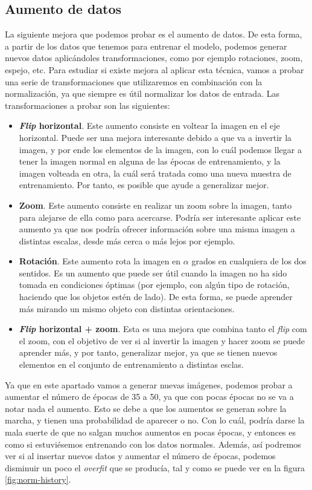 \documentclass[11pt,a4paper]{article}
\begin{document}
\subsection{Aumento de datos}

La siguiente mejora que podemos probar es el aumento de datos. De esta forma, a partir de los datos que tenemos para entrenar
el modelo, podemos generar nuevos datos aplicándoles transformaciones, como por ejemplo rotaciones, zoom, espejo, etc. Para
estudiar si existe mejora al aplicar esta técnica, vamos a probar una serie de transformaciones que utilizaremos en combinación
con la normalización, ya que siempre es útil normalizar los datos de entrada. Las transformaciones a probar son las siguientes:

\begin{itemize}
  \item \textbf{\textit{Flip} horizontal}. Este aumento consiste en voltear la imagen en el eje horizontal. Puede ser
  una mejora interesante debido a que va a invertir la imagen, y por ende los elementos de la imagen, con lo cuál podemos llegar
  a tener la imagen normal en alguna de las épocas de entrenamiento, y la imagen volteada en otra, la cuál será tratada como una
  nueva   muestra de entrenamiento. Por tanto, es posible que ayude a generalizar mejor.
  \item \textbf{Zoom}. Este aumento consiste en realizar un zoom sobre la imagen, tanto para alejarse de ella como para
  acercarse. Podría ser interesante aplicar este aumento ya que nos podría ofrecer información sobre una misma imagen a distintas
  escalas, desde más cerca o más lejos por ejemplo.
  \item \textbf{Rotación}. Este aumento rota la imagen en $\alpha$ grados en cualquiera de los dos sentidos. Es un aumento que puede
  ser útil cuando la imagen no ha sido tomada en condiciones óptimas (por ejemplo, con algún tipo de rotación, haciendo que los
  objetos estén de lado). De esta forma, se puede aprender más mirando un mismo objeto con distintas orientaciones.
  \item \textbf{\textit{Flip} horizontal + zoom}. Esta es una mejora que combina tanto el \textit{flip} com el zoom, con
  el objetivo de ver si al invertir la imagen y hacer zoom se puede aprender más, y por tanto, generalizar mejor, ya que se
  tienen nuevos elementos en el conjunto de entrenamiento a distintas esclas.
\end{itemize}

Ya que en este apartado vamos a generar nuevas imágenes, podemos probar a aumentar el número de épocas de 35 a 50, ya que con
pocas épocas no se va a notar nada el aumento. Esto se debe a que los aumentos se generan sobre la marcha, y tienen una probabilidad
de aparecer o no. Con lo cuál, podría darse la mala suerte de que no salgan muchos aumentos en pocas épocas, y entonces es
como si estuviésemos entrenando con los datos normales. Además, así podremos ver si al insertar nuevos datos y aumentar
el número de épocas, podemos disminuir un poco el \textit{overfit} que se producía, tal y como se puede ver en la figura
\ref{fig:norm-history}.
\end{document}
